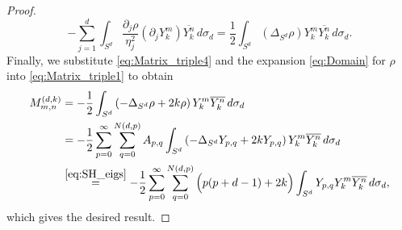 \documentclass[10pt,a4paper]{amsart}
\newcommand{\cc}{\overline}
\newcommand{\del}{\partial}
\begin{document}
\begin{proof}
\begin{equation}
-\sum_{j = 1}^d \int_{S^d} \frac{\del_j\rho}{\eta_j^2}\left(\del_jY_k^m\right)\cc{Y_k^n}\, d\sigma_d = \frac{1}{2}\int_{S^d} \left(\Delta_{S^d}\rho\right) Y_k^m\cc{Y_k^n}\, d\sigma_d. 
\end{equation} 
Finally, we substitute \eqref{eq:Matrix_triple4} and the expansion \eqref{eq:Domain} for $\rho$ into \eqref{eq:Matrix_triple1} to obtain 
\begin{align*} 
M_{m, n}^{(d, k)} & = -\frac{1}{2}\int_{S^d} \left(-\Delta_{S^d}\rho + 2k\rho\right)Y_k^m\cc{Y_k^n}\, d\sigma_d \\ 
& = -\frac{1}{2}\sum_{p = 0}^\infty \sum_{q = 0}^{N(d, p)} A_{p, q}\int_{S^d} \left(-\Delta_{S^d}Y_{p, q} + 2kY_{p, q}\right)Y_k^m\cc{Y_k^n}\, d\sigma_d \\ 
& \stackrel{\eqref{eq:SH_eigs}}{=} -\frac{1}{2}\sum_{p = 0}^\infty \sum_{q = 0}^{N(d, p)} \Big(p(p + d - 1) + 2k\Big)\int_{S^d} Y_{p, q}Y_k^m\cc{Y_k^n}\, d\sigma_d, 
\end{align*} 
which gives the desired result. 
\end{proof} 
\end{document}
